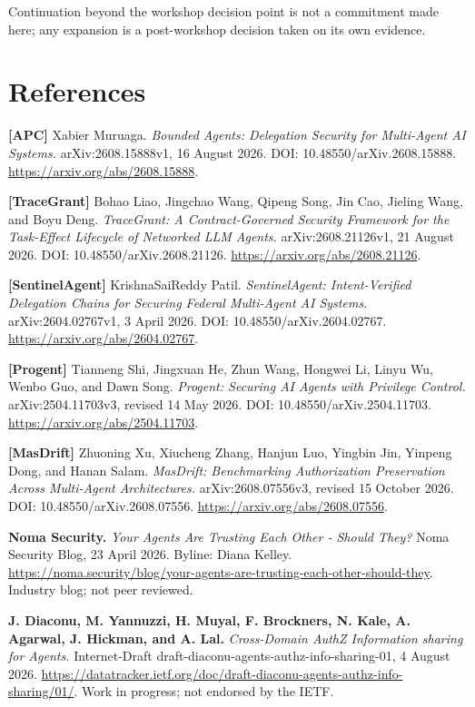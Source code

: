 \documentclass[
  10pt,
]{article}
\renewcommand{\_}{\origunderscore\allowbreak}
\begin{document}
Continuation beyond the workshop decision point is not a commitment made
here; any expansion is a post-workshop decision taken on its own
evidence.

\section{References}\label{references}

\raggedright

\textbf{{[}APC{]}} Xabier Muruaga. \emph{Bounded Agents: Delegation
Security for Multi-Agent AI Systems.} arXiv:2608.15888v1, 16 August
2026. DOI: 10.48550/arXiv.2608.15888.
\url{https://arxiv.org/abs/2608.15888}.

\textbf{{[}TraceGrant{]}} Bohao Liao, Jingchao Wang, Qipeng Song, Jin
Cao, Jieling Wang, and Boyu Deng. \emph{TraceGrant: A Contract-Governed
Security Framework for the Task-Effect Lifecycle of Networked LLM
Agents.} arXiv:2608.21126v1, 21 August 2026. DOI:
10.48550/arXiv.2608.21126. \url{https://arxiv.org/abs/2608.21126}.

\textbf{{[}SentinelAgent{]}} KrishnaSaiReddy Patil. \emph{SentinelAgent:
Intent-Verified Delegation Chains for Securing Federal Multi-Agent AI
Systems.} arXiv:2604.02767v1, 3 April 2026. DOI:
10.48550/arXiv.2604.02767. \url{https://arxiv.org/abs/2604.02767}.

\textbf{{[}Progent{]}} Tianneng Shi, Jingxuan He, Zhun Wang, Hongwei Li,
Linyu Wu, Wenbo Guo, and Dawn Song. \emph{Progent: Securing AI Agents
with Privilege Control.} arXiv:2504.11703v3, revised 14 May 2026. DOI:
10.48550/arXiv.2504.11703. \url{https://arxiv.org/abs/2504.11703}.

\textbf{{[}MasDrift{]}} Zhuoning Xu, Xiucheng Zhang, Hanjun Luo, Yingbin
Jin, Yinpeng Dong, and Hanan Salam. \emph{MasDrift: Benchmarking
Authorization Preservation Across Multi-Agent Architectures.}
arXiv:2608.07556v3, revised 15 October 2026. DOI:
10.48550/arXiv.2608.07556. \url{https://arxiv.org/abs/2608.07556}.

\textbf{Noma Security.} \emph{Your Agents Are Trusting Each Other -
Should They?} Noma Security Blog, 23 April 2026. Byline: Diana Kelley.
\url{https://noma.security/blog/your-agents-are-trusting-each-other-should-they}.
Industry blog; not peer reviewed.

\textbf{J. Diaconu, M. Yannuzzi, H. Muyal, F. Brockners, N. Kale, A.
Agarwal, J. Hickman, and A. Lal.} \emph{Cross-Domain AuthZ Information
sharing for Agents.} Internet-Draft
draft-diaconu-agents-authz-info-sharing-01, 4 August 2026.
\url{https://datatracker.ietf.org/doc/draft-diaconu-agents-authz-info-sharing/01/}.
Work in progress; not endorsed by the IETF.
\end{document}
